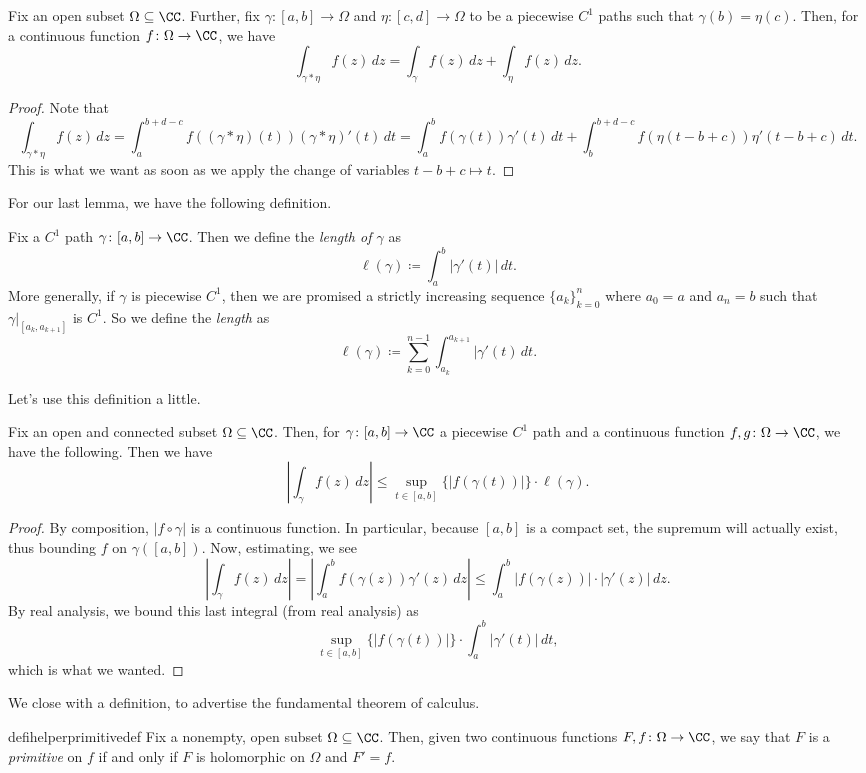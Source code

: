 \begin{lemma} \label{lem:concatintegral}
	Fix an open subset $\Omega\subseteq\CC$. Further, fix $\gamma\colon [a,b]\to\Omega$ and $\eta\colon [c,d]\to\Omega$ to be a piecewise $C^1$ paths such that $\gamma(b)=\eta(c)$. Then, for a continuous function $f\colon \Omega\to\CC$, we have
	\[\int_{\gamma*\eta}f(z)\,dz=\int_\gamma f(z)\,dz+\int_\eta f(z)\,dz.\]
\end{lemma}
\begin{proof}
	Note that
	\[\int_{\gamma*\eta}f(z)\,dz=\int_a^{b+d-c}f((\gamma*\eta)(t))(\gamma*\eta)'(t)\,dt=\int_a^bf(\gamma(t))\gamma'(t)\,dt+\int_{b}^{b+d-c}f(\eta(t-b+c))\eta'(t-b+c)\,dt.\]
	This is what we want as soon as we apply the change of variables $t-b+c\mapsto t$.
\end{proof}
For our last lemma, we have the following definition.
\begin{definition}[Length]
	Fix a $C^1$ path $\gamma\colon [a,b]\to\CC$. Then we define the \textit{length of $\gamma$} as
	\[\ell(\gamma)\coloneqq \int_a^b|\gamma'(t)|\,dt.\]
	More generally, if $\gamma$ is piecewise $C^1$, then we are promised a strictly increasing sequence $\{a_k\}_{k=0}^n$ where $a_0=a$ and $a_n=b$ such that $\gamma|_{[a_k,a_{k+1}]}$ is $C^1$. So we define the \textit{length} as
	\[\ell(\gamma)\coloneqq \sum_{k=0}^{n-1}\int_{a_k}^{a_{k+1}}|\gamma'(t)\,dt.\]
\end{definition}
Let's use this definition a little.
\begin{proposition} \label{lem:estimation}
	Fix an open and connected subset $\Omega\subseteq\CC$. Then, for $\gamma\colon [a,b]\to\CC$ a piecewise $C^1$ path and a continuous function $f,g\colon \Omega\to\CC$, we have the following. Then we have
	\[\left|\int_\gamma f(z)\,dz\right|\le\sup_{t\in[a,b]}\{|f(\gamma(t))|\}\cdot\ell(\gamma).\]
\end{proposition}
\begin{proof}
	By composition, $|f\circ\gamma|$ is a continuous function. In particular, because $[a,b]$ is a compact set, the supremum will actually exist, thus bounding $f$ on $\gamma([a,b])$.  Now, estimating, we see
	\[\left|\int_\gamma f(z)\,dz\right|=\left|\int_a^bf(\gamma(z))\gamma'(z)\,dz\right|\le\int_a^b|f(\gamma(z))|\cdot|\gamma'(z)|\,dz.\]
	By real analysis, we bound this last integral (from real analysis) as
	\[\sup_{t\in[a,b]}\{|f(\gamma(t))|\}\cdot\int_a^b|\gamma'(t)|\,dt,\]
	which is what we wanted.
\end{proof}
We close with a definition, to advertise the fundamental theorem of calculus.
\begin{restatable}[Primitive]{defihelper}{primitivedef} 
	Fix a nonempty, open subset $\Omega\subseteq\CC$. Then, given two continuous functions $F,f\colon \Omega\to\CC$, we say that $F$ is a \textit{primitive} on $f$ if and only if $F$ is holomorphic on $\Omega$ and $F'=f$.
\end{restatable}